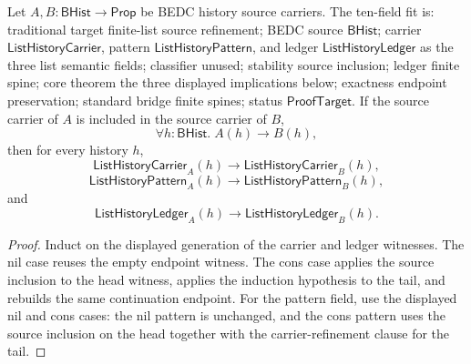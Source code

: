 \begin{theorem}
\label{thm:list-history-semantic-fields-source-refinement}
Let $A,B:\mathsf{BHist}\to\mathsf{Prop}$ be BEDC history source carriers. The
ten-field fit is: traditional target finite-list source refinement; BEDC source
$\mathsf{BHist}$; carrier $\mathsf{ListHistoryCarrier}$, pattern
$\mathsf{ListHistoryPattern}$, and ledger $\mathsf{ListHistoryLedger}$ as the
three list semantic fields; classifier unused; stability source inclusion;
ledger finite spine; core theorem the three displayed implications below;
exactness endpoint preservation; standard bridge finite spines; status
$\mathsf{ProofTarget}$. If the source carrier of $A$ is included in the source
carrier of $B$,
$$
\forall h:\mathsf{BHist}.\; A(h)\to B(h),
$$
then for every history $h$,
$$
\mathsf{ListHistoryCarrier}_A(h)\to\mathsf{ListHistoryCarrier}_B(h),
$$
$$
\mathsf{ListHistoryPattern}_A(h)\to\mathsf{ListHistoryPattern}_B(h),
$$
and
$$
\mathsf{ListHistoryLedger}_A(h)\to\mathsf{ListHistoryLedger}_B(h).
$$
\end{theorem}
\begin{proof}
Induct on the displayed generation of the carrier and ledger witnesses. The nil
case reuses the empty endpoint witness. The cons case applies the source
inclusion to the head witness, applies the induction hypothesis to the tail,
and rebuilds the same continuation endpoint. For the pattern field, use the
displayed nil and cons cases: the nil pattern is unchanged, and the cons pattern
uses the source inclusion on the head together with the carrier-refinement
clause for the tail.
\end{proof}

